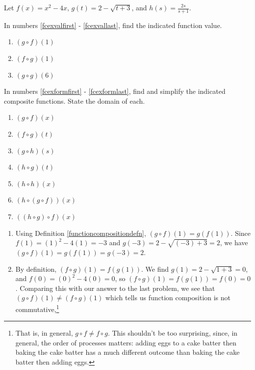 \documentclass{ximera}
\begin{document}
\begin{example}  Let $f(x) = x^2-4x$, $g(t) = 2-\sqrt{t+3}$, and $h(s) = \frac{2s}{s+1}$.  

In numbers \ref{fcexvalfirst} - \ref{fcexvallast}, find the indicated function value.

\begin{enumerate}

\item  $(g \circ f)(1)$ \label{fcexvalfirst}

\item  $(f \circ g)(1)$

\item  $(g \circ g)(6)$ \label{fcexvallast}

\setcounter{HW}{\value{enumi}}
\end{enumerate}

In numbers \ref{fcexformfirst} - \ref{fcexformlast}, find and simplify the indicated composite functions.  State the domain of each.

\begin{enumerate}
\setcounter{enumi}{\value{HW}}

\item  $(g \circ f)(x)$ \label{fcexformfirst}

\item  $(f \circ g)(t)$

\item  $(g \circ h)(s)$

\item  $(h \circ g)(t)$ \label{hogex}

\item  $(h \circ h)(x)$

\item  $(h \circ (g \circ f))(x)$  \label{hogoffirst}

\item  $((h \circ g) \circ f)(x)$ \label{fcexformlast}

\end{enumerate}

\begin{explanation}

\begin{enumerate}

\item  Using Definition \ref{functioncompositiondefn}, $(g \circ f)(1) = g(f(1))$.  Since $f(1) = (1)^2 - 4(1) = -3$ and $g(-3) = 2 - \sqrt{(-3)+3} = 2$, we have $(g \circ f)(1) = g(f(1)) = g(-3) = 2$.

\item  By definition, $(f \circ g)(1) = f(g(1))$.  We find $g(1) = 2 - \sqrt{1+3} = 0$, and $f(0) = (0)^2-4(0) = 0$, so $(f \circ g)(1) = f(g(1)) = f(0) = 0$. Comparing this with our answer to the last problem, we see that $(g \circ f)(1) \neq (f \circ g)(1)$  which tells us function composition is not commutative,\footnote{That is, in general, $g \circ f \neq f \circ g$.  This shouldn't be too surprising, since, in general, the order of processes matters: adding eggs to a cake batter then baking the cake batter has a much different outcome than baking the cake batter then adding eggs.}


\end{enumerate}
\end{explanation}
\end{example}
\end{document}
